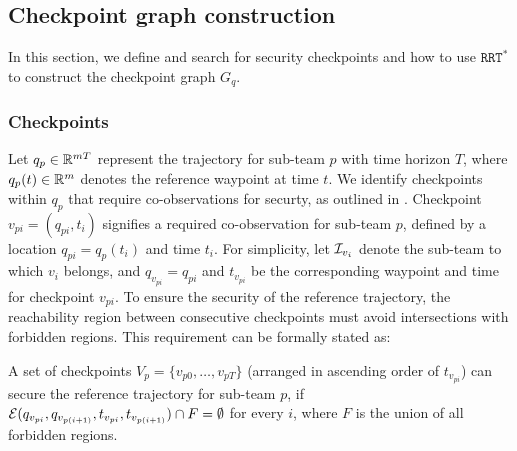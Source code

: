 \documentclass[10pt,twocolumn,twoside]{IEEEtran}
\newcommand{\rrtstar}{$\texttt{RRT}^\texttt{*}$}
\begin{document}
\subsection{Checkpoint graph construction}

In this section, we define and search for security checkpoints and how to use \rrtstar{} to construct the checkpoint graph $G_{q}$.

\subsubsection{Checkpoints}\label{sec:security-checkpoint}
Let $q_p\in\mathbb{R}^{mT}{}$ represent the trajectory for sub-team $p$ with time horizon $T$, where $q_{p}(t) \in \mathbb{R}^{m}{}$ denotes the reference waypoint at time $t$. We identify checkpoints within $q_p$ that require co-observations for securty, as outlined in . Checkpoint $v_{pi}=(q_{pi},t_{i})$ signifies a required co-observation for sub-team $p$, defined by a location $q_{pi}=q_{p}(t_i)$ and time $t_{i}$. For simplicity, let $\mathcal{I}_{v_{i}}$ denote the sub-team to which $v_{i}$ belongs, and $q_{v_{pi}} =q_{pi}$ and $t_{v_{pi}}$ be the corresponding waypoint and time for checkpoint $v_{pi}$. To ensure the security of the reference trajectory, the reachability region between consecutive checkpoints must avoid intersections with forbidden regions. This requirement can be formally stated as:


\begin{remark}
A set of checkpoints $V_{p}=\{ v_{p0}, \dots ,v_{pT}\}$ (arranged in ascending order of $t_{v_{pi}}$) can secure the reference trajectory for sub-team $p$, if $\mathcal{E}(q_{v_{pi}}, q_{v_{p(i+1)}}, t_{v_{pi}},t_{v_{p(i+1)}}) \cap F = \emptyset$ for every $i$, where $F$ is the union of all forbidden regions.
\end{remark}
\end{document}
